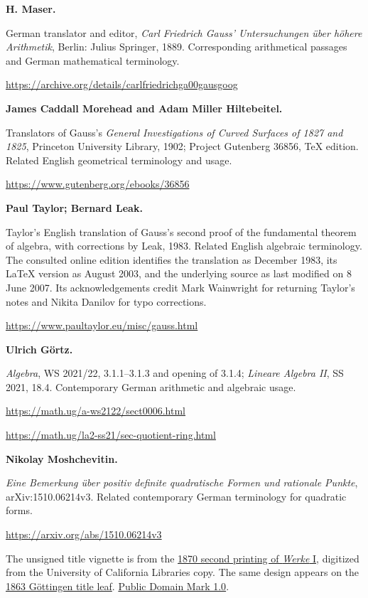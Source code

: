 \par\medskip\noindent\textbf{H. Maser.}\par\nobreak\smallskip\noindent German translator and editor, \emph{Carl Friedrich Gauss' Untersuchungen über höhere Arithmetik}, Berlin: Julius Springer, 1889. Corresponding arithmetical passages and German mathematical terminology.\par
\url{https://archive.org/details/carlfriedrichga00gausgoog}
\par\medskip\noindent\textbf{James Caddall Morehead and Adam Miller Hiltebeitel.}\par\nobreak\smallskip\noindent Translators of Gauss's \emph{General Investigations of Curved Surfaces of 1827 and 1825}, Princeton University Library, 1902; Project Gutenberg 36856, TeX edition. Related English geometrical terminology and usage.\par
\url{https://www.gutenberg.org/ebooks/36856}
\par\medskip\noindent\textbf{Paul Taylor; Bernard Leak.}\par\nobreak\smallskip\noindent Taylor's English translation of Gauss's second proof of the fundamental theorem of algebra, with corrections by Leak, 1983. Related English algebraic terminology. The consulted online edition identifies the translation as December 1983, its LaTeX version as August 2003, and the underlying source as last modified on 8 June 2007. Its acknowledgements credit Mark Wainwright for returning Taylor’s notes and Nikita Danilov for typo corrections.\par
\url{https://www.paultaylor.eu/misc/gauss.html}
\par\medskip\noindent\textbf{Ulrich Görtz.}\par\nobreak\smallskip\noindent \emph{Algebra}, WS 2021/22, 3.1.1–3.1.3 and opening of 3.1.4; \emph{Lineare Algebra II}, SS 2021, 18.4. Contemporary German arithmetic and algebraic usage.\par
\url{https://math.ug/a-ws2122/sect0006.html}\par
\url{https://math.ug/la2-ss21/sec-quotient-ring.html}
\par\medskip\noindent\textbf{Nikolay Moshchevitin.}\par\nobreak\smallskip\noindent \emph{Eine Bemerkung über positiv definite quadratische Formen und rationale Punkte}, arXiv:1510.06214v3. Related contemporary German terminology for quadratic forms.\par
\url{https://arxiv.org/abs/1510.06214v3}



\par\medskip\noindent The unsigned title vignette is from the \href{https://commons.wikimedia.org/w/index.php?oldid=1179960952}{1870 second printing of \textit{Werke} I}, digitized from the University of California Libraries copy. The same design appears on the \href{https://gdz.sub.uni-goettingen.de/id/PPN235993352}{1863 Göttingen title leaf}. \href{https://creativecommons.org/publicdomain/mark/1.0/}{Public Domain Mark 1.0}.
\clearpage\endgroup\clearpage
\setcounter{page}{\the\SavedTranslationPage}
\hypersetup{pageanchor=true}
